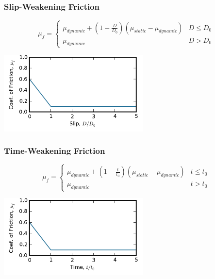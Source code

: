 \documentclass{beamer}
\begin{document}
\begin{frame}
  \frametitle{Slip-Weakening Friction}

  \begin{equation}
    \mu_f = \left\{ \begin{array}{ll}
        \mu_\mathit{dynamic} + (1 - \frac{D}{D_0})
        (\mu_\mathit{static} -\mu_\mathit{dynamic}) & D \leq D_0 \\
        \mu_\mathit{dynamic} & D > D_0
      \end{array} \right.
  \end{equation}
  \begin{center}
    \includegraphics[height=1.65in]{figs/friction_slipweak}
  \end{center}
  
\end{frame}


\begin{frame}
  \frametitle{Time-Weakening Friction}
  
  \begin{equation}
    \mu_f = \left\{ \begin{array}{ll}
        \mu_\mathit{dynamic} + (1 - \frac{t}{t_0})
        (\mu_\mathit{static} -\mu_\mathit{dynamic}) & t \leq t_0 \\
        \mu_\mathit{dynamic} & t > t_0
      \end{array} \right.
  \end{equation}
  \begin{center}
    \includegraphics[height=1.65in]{figs/friction_timeweak}
  \end{center}
  
\end{frame}
\end{document}
